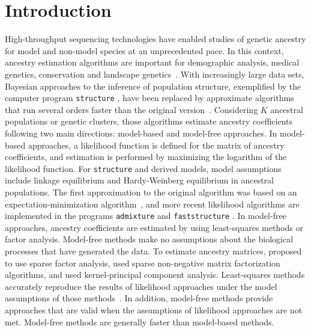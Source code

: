 \section{Introduction}

 High-throughput sequencing technologies have enabled studies of genetic ancestry for model and non-model species at an unprecedented pace. In this  context, ancestry estimation algorithms are important for demographic analysis, medical genetics, conservation and landscape genetics~\citep{Pritchard2000, Tang2005, Schraiber2015, Segelbacher2010, Francois2015}.  With increasingly large data sets, Bayesian approaches to the inference of population structure, exemplified by the computer program {\tt structure} \citep{Pritchard2000}, have been replaced by approximate algorithms that run several orders faster than the original version~\citep{Tang2005, Alexander2011, Frichot2014, Raj2014}.  Considering $K$ ancestral populations or genetic clusters, those algorithms estimate ancestry coefficients following two main directions: model-based and model-free approaches. In model-based approaches, a likelihood function is defined for the matrix of ancestry coefficients, and estimation is performed by maximizing the logarithm of the likelihood function. For {\tt structure} and derived models, model assumptions include linkage equilibrium and Hardy-Weinberg equilibrium in ancestral populations. The first approximation to the original algorithm was based on an expectation-minimization algorithm~\citep{Tang2005}, and more recent likelihood algorithms are implemented in the programs {\tt admixture}  and {\tt faststructure} \citep{Alexander2011, Raj2014}. In model-free approaches, ancestry coefficients are estimated by using least-squares methods or factor analysis. Model-free methods make no assumptions about the biological processes that have generated the data. To estimate ancestry matrices, \cite{Engelhardt2010} proposed to use sparse factor analysis, \cite{Frichot2014} used sparse non-negative matrix factorization algorithms, and \cite{Popescu2014} used kernel-principal component analysis. Least-squares methods accurately reproduce the results of likelihood approaches under the model assumptions of those methods~\citep{Frichot2014, Popescu2014}.  In addition, model-free methods provide approaches that are valid when the assumptions of likelihood approaches are not met. Model-free methods are generally faster than model-based methods. 
   
